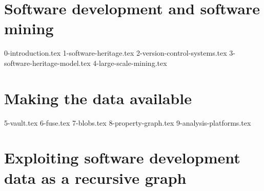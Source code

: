 \documentclass[a4paper,11pt,openbib,draft]{memoir}
\begin{document}
\raggedbottom

\frontmatter
{}
%

\clearemptydoublepage

%

\clearemptydoublepage
%

\clearemptydoublepage
%


\renewcommand{\contentsname}{Table of Contents}
\tableofcontents*
{}
%

\iffalse
\listoftables
\addtocontents{lot}{\par\nobreak\textbf{{\scshape Table} \hfill Page}\par\nobreak}
\clearemptydoublepage
\listoffigures
\addtocontents{lof}{\par\nobreak\textbf{{\scshape Figure} \hfill Page}\par\nobreak}
\clearemptydoublepage
\fi
%
%
\mainmatter
%


\part{Software development and software mining}

{0-introduction.tex}
{1-software-heritage.tex}
{2-version-control-systems.tex}
{3-software-heritage-model.tex}
{4-large-scale-mining.tex}

\iffalse
\part{Making the data available}

{5-vault.tex}
{6-fuse.tex}
{7-blobs.tex}
{8-property-graph.tex}
{9-analysis-platforms.tex}

\part{Exploiting software development data as a recursive graph}
\end{document}
